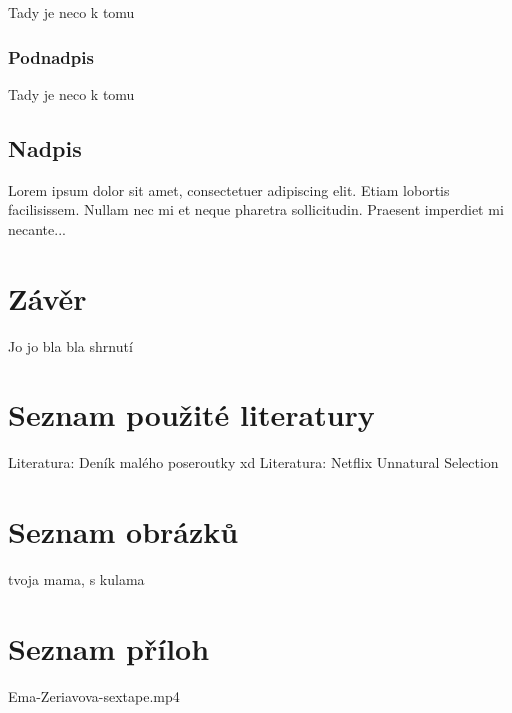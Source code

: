 \documentclass[a4paper,12pt,oneside]{book}
\begin{document}
Tady je neco k tomu

\subsection{Podnadpis}

Tady je neco k tomu

\section{Nadpis}

Lorem ipsum dolor sit amet, consectetuer adipiscing elit.
Etiam lobortis facilisissem.  Nullam nec mi et neque pharetra
sollicitudin.  Praesent imperdiet mi necante...

\chapter{Závěr}
\thispagestyle{fancy}

Jo jo bla bla shrnutí

\chapter{Seznam použité literatury}
\thispagestyle{fancy}

Literatura: Deník malého poseroutky xd
Literatura: Netflix Unnatural Selection

\chapter{Seznam obrázků}
\thispagestyle{fancy}

tvoja mama, s kulama

\chapter{Seznam příloh}
\thispagestyle{fancy}

Ema-Zeriavova-sextape.mp4
\end{document}
